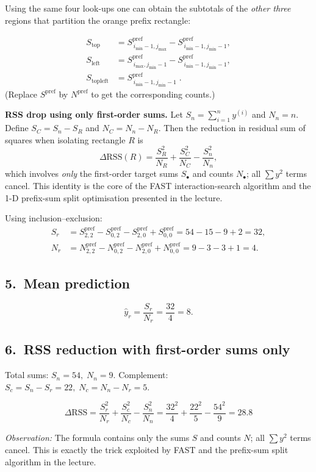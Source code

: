 \documentclass{article}
\begin{document}
\medskip
Using the same four look-ups one can obtain the subtotals of the
\emph{other three} regions that partition the orange prefix rectangle:

\[
\begin{aligned}
S_{\text{top}} &=
  S^{\text{pref}}_{\,i_{\min}-1,j_{\max}}
  -S^{\text{pref}}_{\,i_{\min}-1,j_{\min}-1}, \\[4pt]
S_{\text{left}} &=
  S^{\text{pref}}_{\,i_{\max},j_{\min}-1}
  -S^{\text{pref}}_{\,i_{\min}-1,j_{\min}-1}, \\[4pt]
S_{\text{topleft}} &=
  S^{\text{pref}}_{\,i_{\min}-1,j_{\min}-1}\;.
\end{aligned}
\]
(Replace \(S^{\text{pref}}\) by \(N^{\text{pref}}\) to get the
corresponding counts.)

\bigskip
\noindent
\textbf{RSS drop using only first-order sums.}  
Let \(S_n=\sum_{i=1}^{n}y^{(i)}\) and \(N_n=n\).  Define
\(S_C=S_n-S_R\) and \(N_C=N_n-N_R\).  Then the reduction in residual
sum of squares when isolating rectangle \(R\) is
\begin{equation}
\boxed{\displaystyle
  \Delta\text{RSS}(R)=
      \frac{S_R^{2}}{N_R}
     +\frac{S_C^{2}}{N_C}
     -\frac{S_n^{2}}{N_n}},
\label{eq:rss-drop}
\end{equation}
which involves \emph{only} the first-order target sums \(S_\bullet\) and
counts \(N_\bullet\); all \(\sum y^{2}\) terms cancel.  This identity is
the core of the FAST interaction-search algorithm and the 1-D
prefix-sum split optimisation presented in the lecture.

Using inclusion–exclusion:
\[
\begin{aligned}
S_r &= S^{\text{pref}}_{2,2}-S^{\text{pref}}_{0,2}
      -S^{\text{pref}}_{2,0}+S^{\text{pref}}_{0,0}=54-15-9+2=32,\\
N_r &= N^{\text{pref}}_{2,2}-N^{\text{pref}}_{0,2}
      -N^{\text{pref}}_{2,0}+N^{\text{pref}}_{0,0}=9-3-3+1=4.
\end{aligned}
\]

\subsection*{5.~Mean prediction}
\[
  \hat y_r = \frac{S_r}{N_r}= \frac{32}{4}=8 .
\]

\subsection*{6.~RSS reduction with first-order sums only}
Total sums: \(S_n=54,\;N_n=9\).  
Complement: \(S_c=S_n-S_r=22,\;N_c=N_n-N_r=5\).

\[
\boxed{\displaystyle
  \Delta\text{RSS}
    =\frac{S_r^{2}}{N_r}
     +\frac{S_c^{2}}{N_c}
     -\frac{S_n^{2}}{N_n}
    =\frac{32^{2}}{4}+\frac{22^{2}}{5}-\frac{54^{2}}{9}
    =28.8 } 
\]

\medskip
\noindent
\emph{Observation:} The formula contains only the sums \(S\) and counts \(N\); all
\(\sum y^{2}\) terms cancel.  This is exactly the trick exploited by FAST
and the prefix-sum split algorithm in the lecture.
\end{document}
